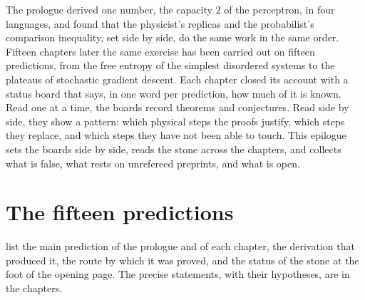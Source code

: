 \begin{refsection}

The prologue derived one number, the capacity $2$ of the perceptron, in four languages, and found that the physicist's replicas and the probabilist's comparison inequality, set side by side, do the same work in the same order. Fifteen chapters later the same exercise has been carried out on fifteen predictions, from the free entropy of the simplest disordered systems to the plateaus of stochastic gradient descent. Each chapter closed its account with a status board that says, in one word per prediction, how much of it is known. Read one at a time, the boards record theorems and conjectures. Read side by side, they show a pattern: which physical steps the proofs justify, which steps they replace, and which steps they have not been able to touch. This epilogue sets the boards side by side, reads the stone across the chapters, and collects what is false, what rests on unrefereed preprints, and what is open.

\section*{The fifteen predictions}

 list the main prediction of the prologue and of each chapter, the derivation that produced it, the route by which it was proved, and the status of the stone at the foot of the opening page. The precise statements, with their hypotheses, are in the chapters.


\end{refsection}
